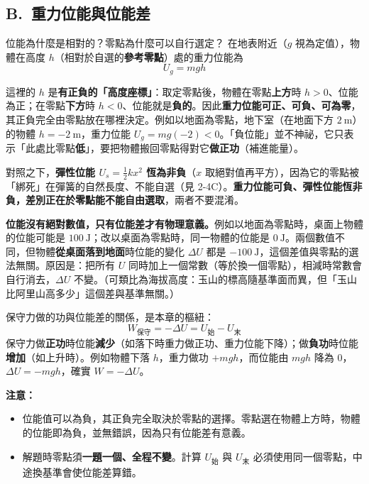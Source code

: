 \documentclass[11pt]{article}
\begin{document}
\subsection*{\sffamily B.\ 重力位能與位能差}

\begin{補充框}{位能為什麼是相對的？零點為什麼可以自行選定？}
在地表附近（$g$ 視為定值），物體在高度 $h$（相對於自選的\textbf{參考零點}）處的重力位能為
$$\boxed{\;U_g=mgh\;}$$

這裡的 $h$ 是\textbf{有正負的「高度座標」}：取定零點後，物體在零點\textbf{上方}時 $h>0$、位能為正；在零點\textbf{下方}時 $h<0$、位能就是\textbf{負的}。因此\textbf{重力位能可正、可負、可為零}，其正負完全由零點放在哪裡決定。例如以地面為零點，地下室（在地面下方 $2\ \text{m}$）的物體 $h=-2\ \text{m}$，重力位能 $U_g=mg(-2)<0$。「負位能」並不神祕，它只表示「此處比零點\textbf{低}」，要把物體搬回零點得對它\textbf{做正功}（補進能量）。

對照之下，\textbf{彈性位能 $U_s=\tfrac12kx^2$ 恆為非負}（$x$ 取絕對值再平方），因為它的零點被「綁死」在彈簧的自然長度、不能自選（見 2-4C）。\textbf{重力位能可負、彈性位能恆非負，差別正在於零點能不能自由選取}，兩者不要混淆。

\textbf{位能沒有絕對數值，只有位能差才有物理意義。}例如以地面為零點時，桌面上物體的位能可能是 $100\ \text{J}$；改以桌面為零點時，同一物體的位能是 $0\ \text{J}$。兩個數值不同，但物體\textbf{從桌面落到地面}時位能的變化 $\Delta U$ 都是 $-100\ \text{J}$，這個差值與零點的選法無關。原因是：把所有 $U$ 同時加上一個常數（等於換一個零點），相減時常數會自行消去，$\Delta U$ 不變。（可類比為海拔高度：玉山的標高隨基準面而異，但「玉山比阿里山高多少」這個差與基準無關。）

保守力做的功與位能差的關係，是本章的樞紐：
$$\boxed{\;W_{\text{保守}}=-\Delta U=U_{\text{始}}-U_{\text{末}}\;}$$
保守力做\textbf{正功}時位能\textbf{減少}（如落下時重力做正功、重力位能下降）；做\textbf{負功}時位能\textbf{增加}（如上升時）。例如物體下落 $h$，重力做功 $+mgh$，而位能由 $mgh$ 降為 0，$\Delta U=-mgh$，確實 $W=-\Delta U$。
\end{補充框}


\textbf{注意：}
\begin{itemize}\setlength{\itemsep}{1pt}
\item 位能值可以為負，其正負完全取決於零點的選擇。零點選在物體上方時，物體的位能即為負，並無錯誤，因為只有位能差有意義。
\item 解題時零點須\textbf{一題一個、全程不變}。計算 $U_{\text{始}}$ 與 $U_{\text{末}}$ 必須使用同一個零點，中途換基準會使位能差算錯。
\end{itemize}
\end{document}
